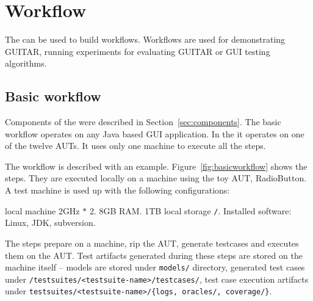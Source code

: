 %
%
\section{Workflow}
\label{sec:workflow}

The \mddozen{} can be used to build workflows. Workflows are used for demonstrating GUITAR, running experiments for evaluating GUITAR or GUI testing algorithms. 

\subsection{Basic workflow}
\label{sec:basicworkflow}

Components of the \mddozen{} were described in Section~\ref{sec:components}. The basic workflow operates on any Java based GUI application. In the \mddozen{} it operates on one of the twelve AUTs. It uses only one machine to execute all the steps.

The workflow is described with an example. Figure~\ref{fig:basicworkflow} shows the steps. They are executed locally on a machine using the toy AUT, RadioButton.\\

\noindent A test machine is used up with the following configurations:\\

\begin{smalldescription}
   \item [local machine] 2GHz $*$ 2. 8GB RAM. 1TB local storage \texttt{/}. Installed software: Linux, JDK, subversion.\\
\end{smalldescription}

The steps prepare \mddozen{} on a machine, rip the AUT, generate testcases and executes them on the AUT. Test artifacts generated during these steps are stored on the machine itself -- models are stored under \texttt{models/} directory, generated test cases under \texttt{/testsuites/<testsuite-name>/testcases/}, test case execution artifacts under \texttt{testsuites/<testsuite-name>/\{logs, oracles/, coverage/\}}.


